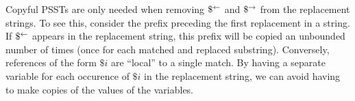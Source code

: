 Copyful PSSTs are only needed when removing $\$^{\leftarrow}$ and $\$^{\rightarrow}$ from the replacement strings.
To see this, consider the prefix preceding the first replacement in a string.
If $\$^{\leftarrow}$ appears in the replacement string, this prefix will be copied an unbounded number of times (once for each matched and replaced substring).
Conversely, references of the form $\$i$ are ``local'' to a single match.
By having a separate variable for each occurence of $\$i$ in the replacement string, we can avoid having to make copies of the values of the variables.


